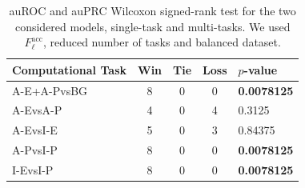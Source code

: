 \begin{table}[!htbp]
\centering
\begin{tabular}[t]{lcccl}
\toprule
Computational Task & Win & Tie & Loss & $p$-value\\
\midrule
A-E+A-PvsBG & 8 & 0 & 0 & \textbf{0.0078125} \\
A-EvsA-P & 4 & 0 & 4 & 0.3125 \\
A-EvsI-E & 5 & 0 & 3 & 0.84375 \\
A-PvsI-P & 8 & 0 & 0 & \textbf{0.0078125} \\
I-EvsI-P & 8 & 0 & 0 & \textbf{0.0078125} \\
\bottomrule
\end{tabular}
\caption{auROC and auPRC Wilcoxon signed-rank test for the two considered models, single-task and multi-tasks. We used $F_\ell^{\textrm{acc}}$, reduced number of tasks and balanced dataset.}
\label{tab:wilcoxon}
\end{table}